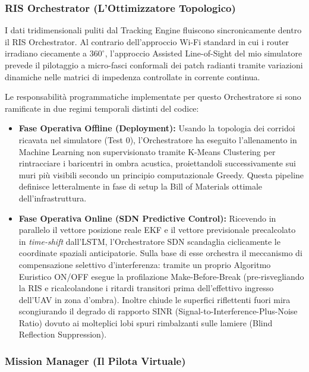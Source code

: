 \documentclass[twoside]{article}
\begin{document}
\subsubsection{RIS Orchestrator (L'Ottimizzatore Topologico)}

I dati tridimensionali puliti dal Tracking Engine fluiscono sincronicamente dentro il RIS Orchestrator. Al contrario dell'approccio Wi-Fi standard in cui i router irradiano ciecamente a $360^\circ$, l'approccio Assisted Line-of-Sight del mio simulatore prevede il pilotaggio a micro-fasci conformali dei patch radianti tramite variazioni dinamiche nelle matrici di impedenza controllate in corrente continua.

Le responsabilità programmatiche implementate per questo Orchestratore si sono ramificate in due regimi temporali distinti del codice:
\begin{itemize}
    \item \textbf{Fase Operativa Offline (Deployment):} Usando la topologia dei corridoi ricavata nel simulatore (Test 0), l'Orchestratore ha eseguito l'allenamento in Machine Learning non supervisionato tramite K-Means Clustering per rintracciare i baricentri in ombra acustica, proiettandoli successivamente sui muri più visibili secondo un principio computazionale Greedy. Questa pipeline definisce letteralmente in fase di setup la Bill of Materials ottimale dell'infrastruttura.
    \item \textbf{Fase Operativa Online (SDN Predictive Control):} Ricevendo in parallelo il vettore posizione reale EKF e il vettore previsionale precalcolato in \textit{time-shift} dall'LSTM, l'Orchestratore SDN scandaglia ciclicamente le coordinate spaziali anticipatorie. Sulla base di esse orchestra il meccanismo di compensazione selettivo d'interferenza: tramite un proprio Algoritmo Euristico ON/OFF esegue la profilazione Make-Before-Break (pre-risvegliando la RIS e ricalcolandone i ritardi transitori prima dell'effettivo ingresso dell'UAV in zona d'ombra). Inoltre chiude le superfici riflettenti fuori mira scongiurando il degrado di rapporto SINR (Signal-to-Interference-Plus-Noise Ratio) dovuto ai molteplici lobi spuri rimbalzanti sulle lamiere (Blind Reflection Suppression).
\end{itemize}

\subsubsection{Mission Manager (Il Pilota Virtuale)}
\end{document}
